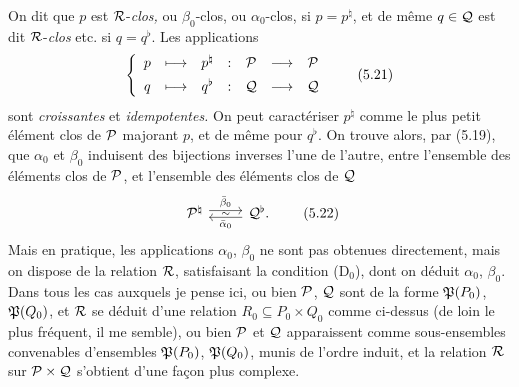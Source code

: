 On dit que $p$ est $\mathcal{R}$-\textit{clos,} ou $\beta_0$-clos, ou $\alpha_0$-clos, si $p = p^{\natural}$, et de même $q \in \mathcal{Q}$ est dit $\mathcal{R}$-\textit{clos} etc. si $q = q^{\flat}$. Les applications
\[
\left\{
\begin{array}{ccccccc}
p & \longmapsto & p^{\natural} & : & \mathcal{P} & \longrightarrow & \mathcal{P}\\[1ex]
q & \longmapsto & q^{\flat} & : & \mathcal{Q} & \longrightarrow & \mathcal{Q}
\end{array}
\right.
\tag*{(5.21)}
\]
sont \textit{croissantes} et \textit{idempotentes.} On peut caractériser $p^{\natural}$ comme le plus petit élément clos de $\mathcal{P}$ majorant $p$, et de même pour $q^{\flat}$. On trouve alors, par (5.19), que $\alpha_0$ et $\beta_0$ induisent des bijections inverses l'une de l'autre,
entre l'ensemble des éléments clos de $\mathcal{P}$, et l'ensemble des éléments clos de $\mathcal{Q}$
\[
\begin{tikzcd}
\cP^{\natural} \arrow[r, shift left, "\bar{\beta}_0"] \arrow[r, phantom, "\scriptstyle\sim"] & \cQ^{\flat}. \arrow[l, shift left, "\bar{\alpha}_0"]
\end{tikzcd}
\tag*{(5.22)}
\]
Mais en pratique, les applications $\alpha_0$, $\beta_0$ ne sont pas obtenues directement, mais on dispose de la relation $\mathcal{R}$, satisfaisant la condition (D$_0$), dont on déduit $\alpha_0$, $\beta_0$. Dans tous les cas auxquels je pense ici, ou bien $\mathcal{P}$, $\mathcal{Q}$ sont de la forme $\mathfrak{P}(P_0)$, $\mathfrak{P}(Q_0)$, et $\mathcal{R}$ se déduit d'une relation $R_0 \subseteq P_0 \times Q_0$ comme ci-dessus (de loin le plus fréquent, il me semble), ou bien $\mathcal{P}$ et $\mathcal{Q}$ apparaissent comme sous-ensembles convenables d'ensembles $\mathfrak{P}(P_0)$, $\mathfrak{P}(Q_0)$, munis de l'ordre induit, et la relation $\mathcal{R}$ sur $\mathcal{P} \times \mathcal{Q}$ s'obtient d'une façon plus complexe.

